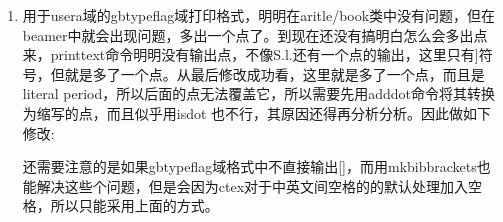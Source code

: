 \begin{enumerate}
\item 用于usera域的gbtypeflag域打印格式，明明在aritle/book类中没有问题，但在beamer中就会出现问题，多出一个点了。到现在还没有搞明白怎么会多出点来，printtext命令明明没有输出点，不像S.l.还有一个点的输出，这里只有]符号，但就是多了一个点。从最后修改成功看，这里就是多了一个点，而且是literal period，所以后面的点无法覆盖它，所以需要先用adddot命令将其转换为缩写的点，而且似乎用isdot 也不行，其原因还得再分析分析。因此做如下修改:

\begin{texlist}
%

\end{texlist}

还需要注意的是如果gbtypeflag域格式中不直接输出[]，而用mkbibbrackets也能解决这些个问题，但是会因为ctex对于中英文间空格的的默认处理加入空格，所以只能采用上面的方式。


\end{enumerate}
